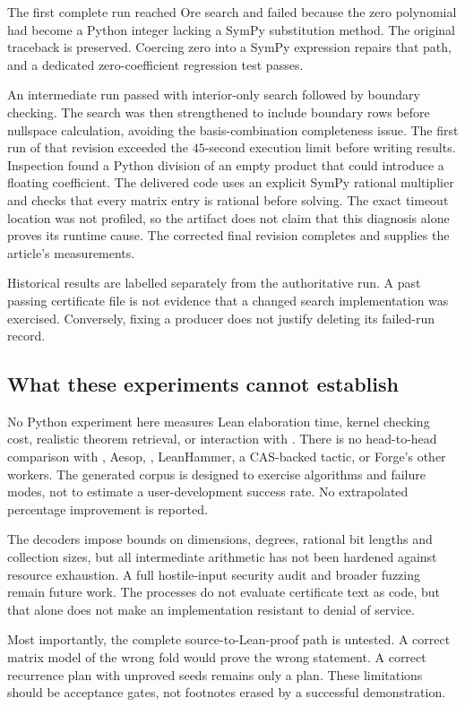 The first complete run reached Ore search and failed because the zero
polynomial had become a Python integer lacking a SymPy substitution method.
The original traceback is preserved. Coercing zero into a SymPy expression
repairs that path, and a dedicated zero-coefficient regression test passes.

An intermediate run passed with interior-only search followed by boundary
checking. The search was then strengthened to include boundary rows before
nullspace calculation, avoiding the basis-combination completeness issue.
The first run of that revision exceeded the $45$-second execution limit before
writing results. Inspection found a Python division of an empty product that
could introduce a floating coefficient. The delivered code uses an explicit
SymPy rational multiplier and checks that every matrix entry is rational before
solving. The exact timeout location was not profiled, so the artifact does not
claim that this diagnosis alone proves its runtime cause. The corrected final
revision completes and supplies the article's measurements.

Historical results are labelled separately from the authoritative run. A past
passing certificate file is not evidence that a changed search implementation
was exercised. Conversely, fixing a producer does not justify deleting its
failed-run record.

\subsection{What these experiments cannot establish}

No Python experiment here measures Lean elaboration time, kernel checking cost,
realistic theorem retrieval, or interaction with \grind{}. There is no
head-to-head comparison with \grind{}, Aesop, , LeanHammer, a
CAS-backed tactic, or Forge's other workers. The generated corpus is designed
to exercise algorithms and failure modes, not to estimate a user-development
success rate. No extrapolated percentage improvement is reported.

The decoders impose bounds on dimensions, degrees, rational bit lengths and
collection sizes, but all intermediate arithmetic has not been hardened against
resource exhaustion. A full hostile-input security audit and broader fuzzing
remain future work. The processes do not evaluate certificate text as code,
but that alone does not make an implementation resistant to denial of service.

Most importantly, the complete source-to-Lean-proof path is untested. A correct
matrix model of the wrong fold would prove the wrong statement. A correct
recurrence plan with unproved seeds remains only a plan. These limitations
should be acceptance gates, not footnotes erased by a successful demonstration.

